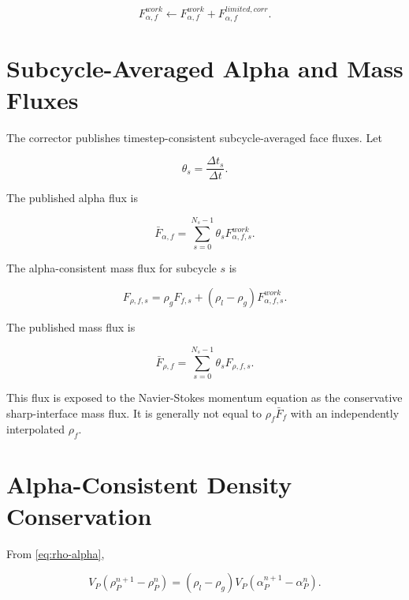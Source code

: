 \documentclass[11pt]{article}
\begin{document}
\begin{equation}
  F_{\alpha,f}^{work}
  \leftarrow
  F_{\alpha,f}^{work}
  +
  F_{\alpha,f}^{limited,corr}.
\end{equation}

\section{Subcycle-Averaged Alpha and Mass Fluxes}

The corrector publishes timestep-consistent subcycle-averaged face fluxes.  Let

\begin{equation}
  \theta_s=\frac{\Delta t_s}{\Delta t}.
\end{equation}

The published alpha flux is

\begin{equation}
  \bar{F}_{\alpha,f}
  =
  \sum_{s=0}^{N_s-1}
  \theta_s F_{\alpha,f,s}^{work}.
  \label{eq:published-alpha-flux}
\end{equation}

The alpha-consistent mass flux for subcycle \(s\) is

\begin{equation}
  F_{\rho,f,s}
  =
  \rho_g F_{f,s}
  +
  (\rho_l-\rho_g)
  F_{\alpha,f,s}^{work}.
  \label{eq:rho-flux-subcycle}
\end{equation}

The published mass flux is

\begin{equation}
  \bar{F}_{\rho,f}
  =
  \sum_{s=0}^{N_s-1}
  \theta_s F_{\rho,f,s}.
  \label{eq:published-rho-flux}
\end{equation}

This flux is exposed to the Navier-Stokes momentum equation as the conservative
sharp-interface mass flux.  It is generally not equal to
\(\rho_f\bar{F}_f\) with an independently interpolated \(\rho_f\).

\section{Alpha-Consistent Density Conservation}

From \eqref{eq:rho-alpha},

\begin{equation}
  V_P(\rho_P^{n+1}-\rho_P^n)
  =
  (\rho_l-\rho_g)
  V_P(\alpha_P^{n+1}-\alpha_P^n).
\end{equation}
\end{document}
